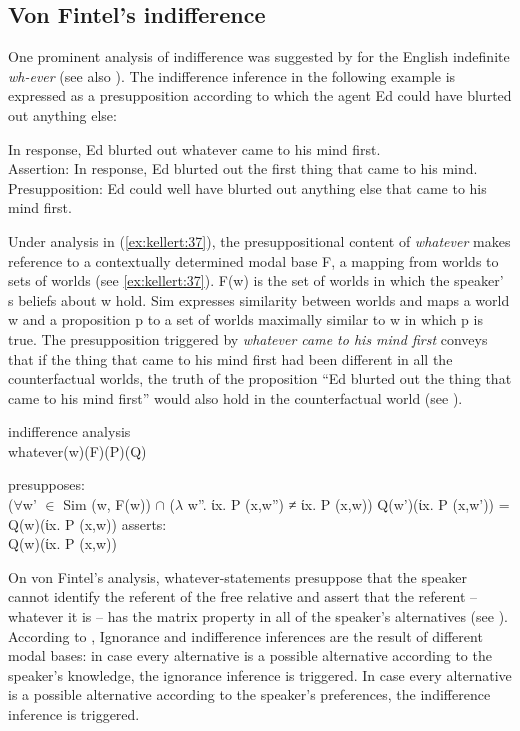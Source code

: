 \documentclass[output=paper]{langsci/langscibook}
\begin{document}
\subsection{Von Fintel’s indifference}\label{sec:kellert:3.1}
One prominent analysis of indifference was suggested by \citep{Fintel2000} for the English indefinite \textit{wh-ever} (see also \citealt{Condoravdi2005}). The indifference inference in the following example is expressed as a presupposition according to which the agent Ed could have blurted out anything else:

\ea\label{ex:kellert:36} In response, Ed blurted out whatever came to his mind first.\\
	Assertion: In response, Ed blurted out the first thing that came to his mind.\\
	Presupposition: Ed could well have blurted out anything else that came to his mind first.
\z

Under  analysis in (\ref{ex:kellert:37}), the presuppositional content of \textit{whatever} makes reference to a contextually determined modal base F, a mapping from worlds to sets of worlds (see \ref{ex:kellert:37}). F(w) is the set of worlds in which the speaker' s beliefs about w hold. Sim expresses similarity between worlds and maps a world w and a proposition p to a set of worlds maximally similar to w in which p is true. The presupposition triggered by \textit{whatever came to his mind first} conveys that if the thing that came to his mind first had been different in all the counterfactual worlds, the truth of the proposition “Ed blurted out the thing that came to his mind first” would also hold in the counterfactual world (see \citealt{Condoravdi2005}).

\ea\label{ex:kellert:37} indifference analysis \citep{Fintel2000}\\
whatever(w)(F)(P)(Q)
\begin{xlist}
\ex presupposes:\\
{($\forall$w’ $\in$ Sim (w, F(w)) $\cap$ ($\lambda$ w”. ίx. P (x,w”) ≠ ίx. P (x,w))
	Q(w’)(ίx. P (x,w’)) = Q(w)(ίx. P (x,w))}
\ex	asserts:\\
{Q(w)(ίx. P (x,w))}
\end{xlist}
\z

On von Fintel’s analysis, whatever-statements presuppose that the speaker cannot identify the referent of the free relative and assert that the referent -- whatever it is -- has the matrix property in all of the speaker's alternatives (see \citealt{Condoravdi2005}). According to \cite{Fintel2000}, Ignorance and indifference inferences are the result of different modal bases: in case every alternative is a possible alternative according to the speaker’s knowledge, the ignorance inference is triggered. In case every alternative is a possible alternative according to the speaker's preferences, the indifference inference is triggered.
\end{document}
